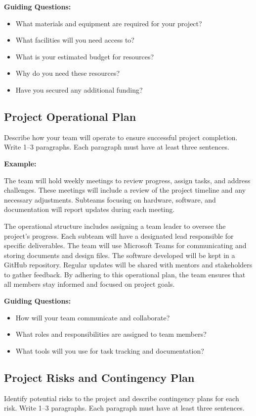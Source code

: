 \textbf{Guiding Questions:}
\begin{itemize}
    \item What materials and equipment are required for your project?
    \item What facilities will you need access to?
    \item What is your estimated budget for resources?
    \item Why do you need these resources?
    \item Have you secured any additional funding?
\end{itemize}

\subsection{Project Operational Plan}
Describe how your team will operate to ensure successful project completion. Write 1–3 paragraphs. Each paragraph must have at least three sentences.

\textbf{Example:}

The team will hold weekly meetings to review progress, assign tasks, and address challenges. These meetings will include a review of the project timeline and any necessary adjustments. Subteams focusing on hardware, software, and documentation will report updates during each meeting.

The operational structure includes assigning a team leader to oversee the project's progress. Each subteam will have a designated lead responsible for specific deliverables. The team will use Microsoft Teams for communicating and storing documents and design files. The software developed will be kept in a GitHub repository. Regular updates will be shared with mentors and stakeholders to gather feedback. By adhering to this operational plan, the team ensures that all members stay informed and focused on project goals.

\textbf{Guiding Questions:}
\begin{itemize}
    \item How will your team communicate and collaborate?
    \item What roles and responsibilities are assigned to team members?
    \item What tools will you use for task tracking and documentation?
\end{itemize}

\subsection{Project Risks and Contingency Plan}
Identify potential risks to the project and describe contingency plans for each risk. Write 1–3 paragraphs. Each paragraph must have at least three sentences.

